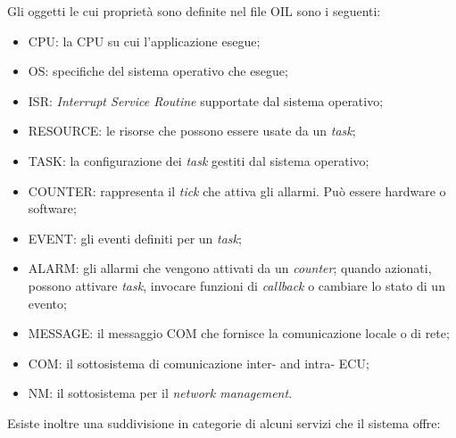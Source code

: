 \documentclass{article}
\begin{document}
Gli oggetti le cui proprietà sono definite nel file OIL sono i seguenti:
\begin{itemize}
	\item CPU: la CPU su cui l'applicazione esegue;
	\item OS: specifiche del sistema operativo che esegue;
	\item ISR: \textit{Interrupt Service Routine} supportate dal sistema operativo;
	\item RESOURCE: le risorse che possono essere usate da un \textit{task};
	\item TASK: la configurazione dei \textit{task} gestiti dal sistema operativo;
	\item COUNTER: rappresenta il \textit{tick} che attiva gli allarmi. Può essere hardware o software;
	\item EVENT: gli eventi definiti per un \textit{task};
	\item  ALARM: gli allarmi che vengono attivati da un \textit{counter}; quando azionati, possono attivare \textit{task}, invocare funzioni di \textit{callback} o cambiare lo stato di un evento;
	\item MESSAGE: il messaggio COM che fornisce la comunicazione locale o di rete;
	\item COM: il sottosistema di comunicazione inter- and intra- ECU;
	\item NM: il sottosistema per il \textit{network management}.
\end{itemize}
Esiste inoltre una suddivisione in categorie di alcuni servizi che il sistema offre:
\end{document}
